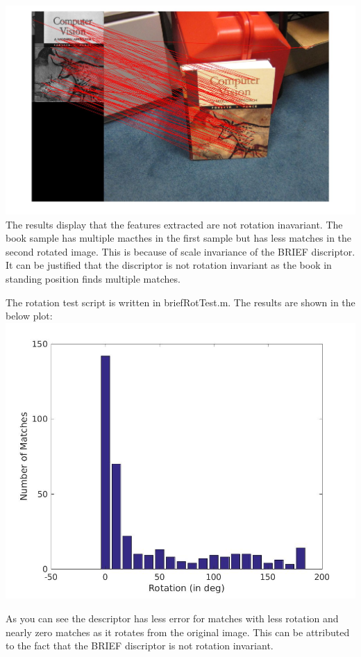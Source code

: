 \documentclass[12pt]{article}
\newenvironment{problem}[2][Problem]{\begin{trivlist}
\item[\hskip \labelsep {\bfseries #1}\hskip \labelsep {\bfseries #2.}]}{\end{trivlist}}
\begin{document}
\begin{problem}{2.4}
\includegraphics[scale=0.2]{results/books_stand}\\

The results display that the features extracted are not rotation inavariant. The book sample has multiple macthes in the first sample but has less matches in the second rotated image. This is because of scale invariance of the BRIEF discriptor. It can be justified that the discriptor is not rotation invariant as the book in standing position finds multiple matches.
\end{problem}


\begin{problem}{2.5}
The rotation test script is written in briefRotTest.m. The results are shown in the below plot:\\
\includegraphics[scale = 0.4]{results/RotTest}

As you can see the descriptor has less error for matches with less rotation and nearly zero matches as it rotates from the original image. This can be attributed to the fact that the BRIEF discriptor is not rotation invariant.
\end{problem}
\end{document}
